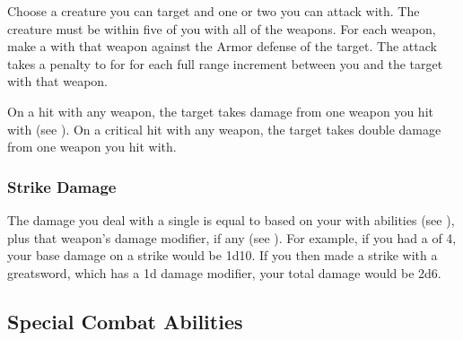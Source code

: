         \begin{freeability}{}
            Choose a creature you can target and one or two  you can attack with.
            The creature must be within five  of you with all of the weapons.
            For each weapon, make a  with that weapon against the Armor defense of the target.
            The attack takes a  penalty to  for for each full range increment between you and the target with that weapon.

            On a hit with any weapon, the target takes damage from one weapon you hit with (see ).
            On a critical hit with any weapon, the target takes double damage from one weapon you hit with.
        \end{freeability}

        \subsubsection{Strike Damage}\label{Strike Damage}
            The damage you deal with a single  is equal to  based on your  with  abilities (see ), plus that weapon's damage modifier, if any (see ).
            For example, if you had a  of 4, your base damage on a strike would be 1d10.
            If you then made a strike with a greatsword, which has a \plus1d damage modifier, your total damage would be 2d6.

    \subsection{Special Combat Abilities}\label{Special Combat Abilities}

